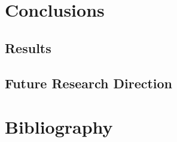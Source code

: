 \documentclass{article}
\begin{document}
	
	\section{Conclusions}
	\subsection{Results}
	\subsection{Future Research Direction}
	\section{Bibliography}
	
	
\end{document}
